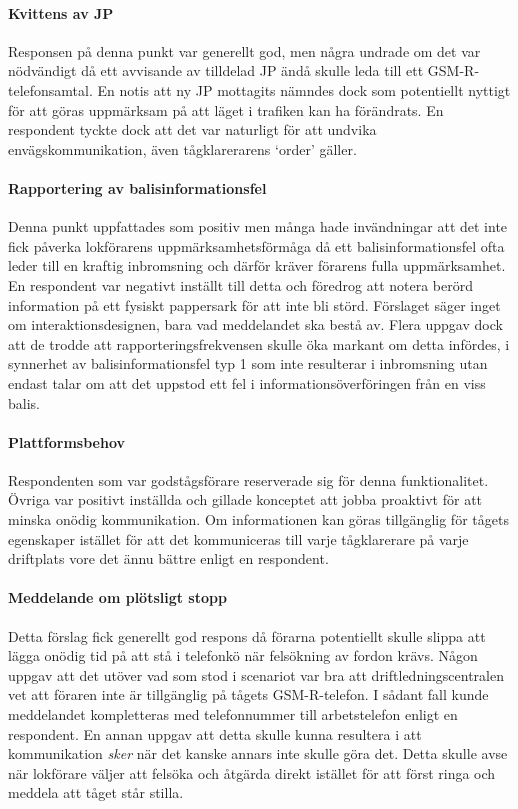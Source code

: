 \paragraph{Kvittens av JP}
Responsen på denna punkt var generellt god, men några undrade om det var nödvändigt då ett avvisande av tilldelad JP ändå skulle leda till ett GSM-R-telefonsamtal.
En notis att ny JP mottagits nämndes dock som potentiellt nyttigt för att göras uppmärksam på att läget i trafiken kan ha förändrats.
En respondent tyckte dock att det var naturligt för att undvika envägskommunikation, även tågklarerarens \lq{}order\rq{} gäller.
\paragraph{Rapportering av balisinformationsfel}
Denna punkt uppfattades som positiv men många hade invändningar att det inte fick påverka lokförarens uppmärksamhetsförmåga då ett balisinformationsfel ofta leder till en kraftig inbromsning och därför kräver förarens fulla uppmärksamhet.
En respondent var negativt inställt till detta och föredrog att notera berörd information på ett fysiskt pappersark för att inte bli störd.
Förslaget säger inget om interaktionsdesignen, bara vad meddelandet ska bestå av.
Flera uppgav dock att de trodde att rapporteringsfrekvensen skulle öka markant om detta infördes, i synnerhet av balisinformationsfel typ 1 som inte resulterar i inbromsning utan endast talar om att det uppstod ett fel i informationsöverföringen från en viss balis.
\paragraph{Plattformsbehov}
Respondenten som var godstågsförare reserverade sig för denna funktionalitet.
Övriga var positivt inställda och gillade konceptet att jobba proaktivt för att minska onödig kommunikation.
Om informationen kan göras tillgänglig för tågets egenskaper istället för att det kommuniceras till varje tågklarerare på varje driftplats vore det ännu bättre enligt en respondent.
\paragraph{Meddelande om plötsligt stopp}
Detta förslag fick generellt god respons då förarna potentiellt skulle slippa att lägga onödig tid på att stå i telefonkö när felsökning av fordon krävs.
Någon uppgav att det utöver vad som stod i scenariot var bra att driftledningscentralen vet att föraren inte är tillgänglig på tågets GSM-R-telefon.
I sådant fall kunde meddelandet kompletteras med telefonnummer till arbetstelefon enligt en respondent.
En annan uppgav att detta skulle kunna resultera i att kommunikation \emph{sker} när det kanske annars inte skulle göra det.
Detta skulle avse när lokförare väljer att felsöka och åtgärda direkt istället för att först ringa och meddela att tåget står stilla.
